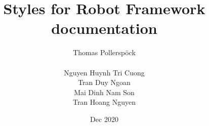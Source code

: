 \documentclass[a4paper,10pt]{report}
\begin{document}
\author{Thomas Pollerspöck \\ \\ Nguyen Huynh Tri Cuong \\ Tran Duy Ngoan \\ Mai Dinh Nam Son \\ Tran Hoang Nguyen}
\title{Styles for Robot Framework documentation}
\date{Dec 2020}

\maketitle
\tableofcontents








\end{document}
